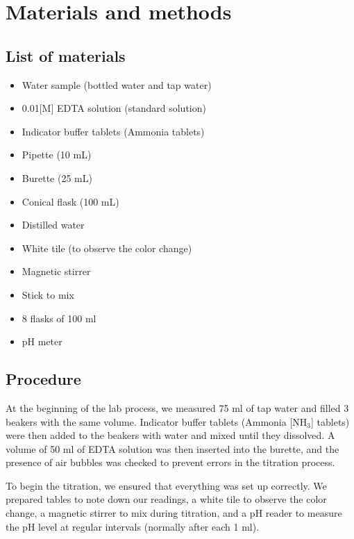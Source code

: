 \documentclass{article}
\begin{document}
\section{Materials and methods}
\subsection{List of materials}
\begin{minipage}[t]{0.48\textwidth}
\begin{itemize}
    \item Water sample (bottled water and tap water)
    \item 0.01[M] EDTA solution (standard solution)
    \item Indicator buffer tablets (Ammonia tablets)
    \item Pipette (10 mL)
    \item Burette (25 mL)
    \item Conical flask (100 mL)
\end{itemize}
\end{minipage}%
\hfill
\begin{minipage}[t]{0.48\textwidth}
\begin{itemize}
    \item Distilled water
    \item White tile (to observe the color change)
    \item Magnetic stirrer
    \item Stick to mix
    \item 8 flasks of 100 ml
    \item pH meter
\end{itemize}
\end{minipage}

\subsection{Procedure}\label{sub:procedure}
At the beginning of the lab process, we measured 75 ml of tap water
and filled 3 beakers with the same volume. Indicator buffer tablets
(Ammonia [NH$_3$] tablets) were then added to the beakers with water and
mixed until they dissolved. A volume of 50 ml of EDTA solution was
then inserted into the burette, and the presence of air bubbles was
checked to prevent errors in the titration process.

To begin the titration, we ensured that everything was set up correctly.
We prepared tables to note down our readings, a white tile to observe
the color change, a magnetic stirrer to mix during titration, and a
pH reader to measure the pH level at regular intervals
(normally after each 1 ml).
\end{document}
